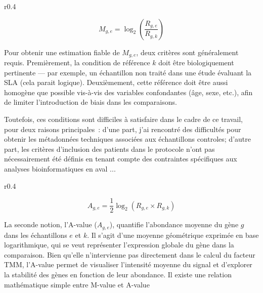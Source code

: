 \begin{wrapfigure}{r}{0.4\textwidth}
\vspace{-5mm}
\begin{tcolorbox}[colback=lightgray,colframe=darkblue,boxrule=0.5pt,arc=2pt,boxsep=5pt,width=0.40\textwidth,title=\center La M-value (TMM),fonttitle=\bfseries\small]
\begin{equation*}
M_{g,e} = \log_2 \left( \frac{R_{g,e}}{R_{g,k}} \right)
\end{equation*}
\end{tcolorbox}
\end{wrapfigure}
Pour obtenir une estimation fiable de \(M_{g,e}\), deux critères sont généralement requis. Premièrement, la condition de référence \(k\) doit être biologiquement pertinente — par exemple, un échantillon non traité dans une étude évaluant la SLA (cela parait logique). Deuxièmement, cette référence doit être aussi homogène que possible vis-à-vis des variables confondantes (âge, sexe, etc.), afin de limiter l’introduction de biais dans les comparaisons.

Toutefois, ces conditions sont difficiles à satisfaire dans le cadre de ce travail, pour deux raisons principales~: d’une part, j’ai rencontré des difficultés pour obtenir les métadonnées techniques associées aux échantillons controles; d’autre part, les critères d’inclusion des patients dans le protocole n’ont pas nécessairement été définis en tenant compte des contraintes spécifiques aux analyses bioinformatiques en aval ...

\begin{wrapfigure}{r}{0.4\textwidth}
\vspace{-10mm}
\begin{tcolorbox}[colback=lightgray,colframe=darkblue,boxrule=0.5pt,arc=2pt,boxsep=5pt,width=0.40\textwidth,title=\center Formule de calcul de la A-value,fonttitle=\bfseries\small]
\begin{equation*}
A_{g,e} = \frac{1}{2} \log_2 \left( R_{g,e} \times R_{g,k} \right)
\end{equation*}
\end{tcolorbox}

\end{wrapfigure}

La seconde notion, l’A-value (\(A_{g,e}\)), quantifie l’abondance moyenne du gène \(g\) dans les échantillons \(e\) et \(k\). Il s’agit d’une moyenne géométrique exprimée en base logarithmique, qui se veut représenter l’expression globale du gène dans la comparaison. Bien qu'elle n'intervienne pas directement dans le calcul du facteur TMM, l’A-value permet de visualiser l’intensité moyenne du signal et d’explorer la stabilité des gènes en fonction de leur abondance. Il existe une relation mathématique simple entre M-value et A-value\textsuperscript{\cite{robinson_scaling_2010}}

